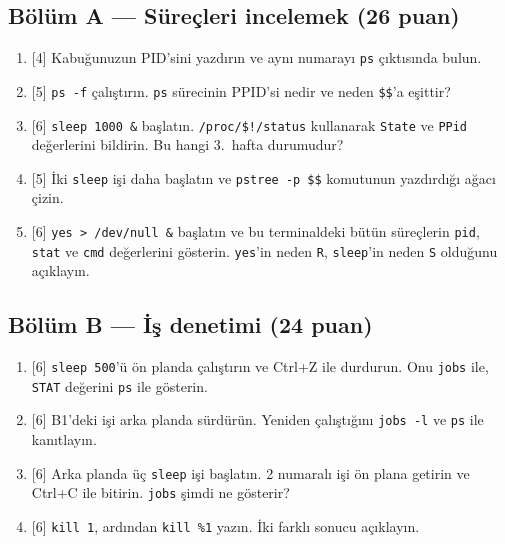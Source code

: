 \documentclass[11pt,a4paper]{article}
\newcommand{\cmd}[1]{\texttt{#1}}
\begin{document}
\subsection*{Bölüm A --- Süreçleri incelemek (26 puan)}
\begin{enumerate}[leftmargin=2.2em,label=\textbf{A\arabic*}]
  \item {[4]} Kabuğunuzun PID'sini yazdırın ve aynı numarayı \cmd{ps} çıktısında bulun.
  \item {[5]} \cmd{ps -f} çalıştırın. \cmd{ps} sürecinin PPID'si nedir ve neden \verb|$$|'a eşittir?
  \item {[6]} \cmd{sleep 1000 \&} başlatın. \texttt{/proc/\$!/status} kullanarak \texttt{State} ve \texttt{PPid} değerlerini bildirin. Bu hangi 3.~hafta durumudur?
  \item {[5]} İki \cmd{sleep} işi daha başlatın ve \cmd{pstree -p \$\$} komutunun yazdırdığı ağacı çizin.
  \item {[6]} \cmd{yes > /dev/null \&} başlatın ve bu terminaldeki bütün süreçlerin \texttt{pid}, \texttt{stat} ve \texttt{cmd} değerlerini gösterin. \cmd{yes}'in neden \texttt{R}, \cmd{sleep}'in neden \texttt{S} olduğunu açıklayın.
\end{enumerate}

\subsection*{Bölüm B --- İş denetimi (24 puan)}
\begin{enumerate}[leftmargin=2.2em,label=\textbf{B\arabic*}]
  \item {[6]} \cmd{sleep 500}'ü ön planda çalıştırın ve Ctrl+Z ile durdurun. Onu \cmd{jobs} ile, \texttt{STAT} değerini \cmd{ps} ile gösterin.
  \item {[6]} B1'deki işi arka planda sürdürün. Yeniden çalıştığını \cmd{jobs -l} ve \cmd{ps} ile kanıtlayın.
  \item {[6]} Arka planda üç \cmd{sleep} işi başlatın. 2 numaralı işi ön plana getirin ve Ctrl+C ile bitirin. \cmd{jobs} şimdi ne gösterir?
  \item {[6]} \cmd{kill 1}, ardından \cmd{kill \%1} yazın. İki farklı sonucu açıklayın.
\end{enumerate}
\end{document}
